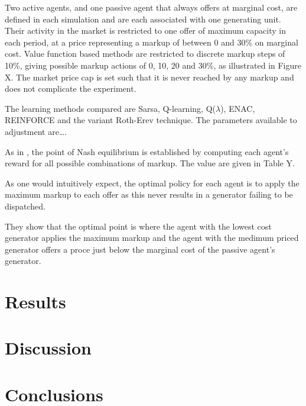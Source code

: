 Two active agents, and one passive agent that always offers at marginal cost,
are defined in each simulation and are each associated with one generating
unit. Their activity in the market is restricted to one offer of maximum
capacity in each period, at a price representing a markup of between 0 and 30\%
on marginal cost.  Value function based methods are restricted to discrete markup steps of
10\%, giving possible markup actions of 0, 10, 20 and 30\%, as illustrated in
Figure X.  The market price cap is set such that it is never reached by any
markup and does not complicate the experiment.

The learning methods compared are Sarsa, Q-learning, Q($\lambda$), ENAC,
REINFORCE and the variant Roth-Erev technique.  The parameters available to
adjustment are\ldots.

As in , the point of Nash equilibrium is established by
computing each agent's reward for all possible combinations of markup.  The
value are given in Table Y.

As one would intuitively expect, the optimal policy for each agent is to apply
the maximum markup to each offer as this never results in a generator failing
to be dispatched.

They show that the optimal point is where the agent with the lowest cost
generator applies the maximum markup and the agent with the medimum priced
generator offers a proce just below the marginal cost of the passive
agent's generator.


\section{Results}
\section{Discussion}
\section{Conclusions}


